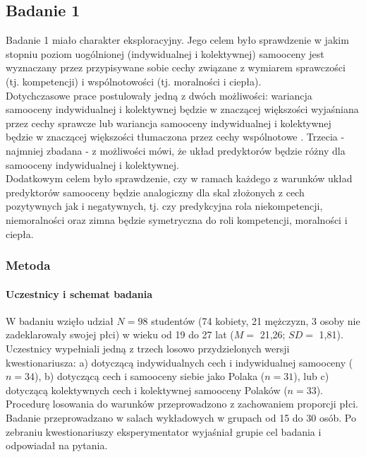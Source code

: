 \documentclass[man]{apa6}
\begin{document}
\newpage
\subsection{Badanie 1}

Badanie 1 miało charakter eksploracyjny. Jego celem było sprawdzenie w jakim stopniu poziom uogólnionej (indywidualnej i kolektywnej) samooceny jest wyznaczany przez przypisywane sobie cechy związane z wymiarem sprawczości (tj. kompetencji) i wspólnotowości (tj. moralności i ciepła).\\
Dotychczasowe prace postulowały jedną z dwóch możliwości: wariancja samooceny indywidualnej i kolektywnej będzie w znaczącej większości wyjaśniana przez cechy sprawcze \parencite{wojciszke2011self} lub wariancja samooceny indywidualnej i kolektywnej będzie w znaczącej większości tłumaczona przez cechy wspólnotowe \parencite[przede wszystkim moralność, np.][]{leach2007group}. Trzecia - najmniej zbadana - z możliwości mówi, że układ predyktorów będzie różny dla samooceny indywidualnej i kolektywnej.\\
Dodatkowym celem było sprawdzenie, czy w ramach każdego z warunków układ predyktorów samooceny będzie analogiczny dla skal złożonych z cech pozytywnych jak i negatywnych, tj. czy predykcyjna rola niekompetencji, niemoralności oraz zimna będzie symetryczna do roli kompetencji, moralności i ciepła.

\subsubsection{Metoda}

\paragraph{Uczestnicy i schemat badania}
W badaniu wzięło udział $N=98$ studentów (74 kobiety, 21 mężczyzn, 3 osoby nie zadeklarowały swojej płci) w wieku od 19 do 27 lat ($M = $ 21,26; $SD =$ 1,81). Uczestnicy wypełniali jedną z trzech losowo przydzielonych wersji kwestionariusza: a) dotyczącą indywidualnych cech i indywidualnej samooceny ($n = 34$), b) dotyczącą cech i samooceny siebie jako Polaka ($n = 31$), lub c) dotyczącą kolektywnych cech i kolektywnej samooceny Polaków ($n = 33$). Procedurę losowania do warunków przeprowadzono z zachowaniem proporcji płci. Badanie przeprowadzano w salach wykładowych w grupach od 15 do 30 osób. Po zebraniu kwestionariuszy eksperymentator wyjaśniał grupie cel badania i odpowiadał na pytania.
\end{document}
